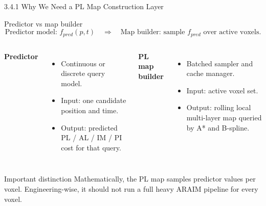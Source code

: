 \documentclass[10pt,aspectratio=169,xcolor=dvipsnames]{beamer}
\begin{document}
\begin{frame}{3.4.1 Why We Need a PL Map Construction Layer}
  \small
  \begin{block}{Predictor vs map builder}
    \vspace{-4pt}
    \[
      \text{Predictor model: } f_{pred}(p,t)\quad\Longrightarrow\quad
      \text{Map builder: sample } f_{pred} \text{ over active voxels.}
    \]
  \end{block}

  \begin{columns}[T]
    \textbf{Predictor}
    \begin{itemize}\footnotesize
      \item Continuous or discrete query model.
      \item Input: one candidate position and time.
      \item Output: predicted PL / AL / IM / PI cost for that query.
    \end{itemize}

    \textbf{PL map builder}
    \begin{itemize}\footnotesize
      \item Batched sampler and cache manager.
      \item Input: active voxel set.
      \item Output: rolling local multi-layer map queried by A* and B-spline.
    \end{itemize}
  \end{columns}

  \begin{alertblock}{Important distinction}
    \footnotesize Mathematically, the PL map samples predictor values per voxel. Engineering-wise, it should not run a full heavy ARAIM pipeline for every voxel.
  \end{alertblock}
\end{frame}
\end{document}
